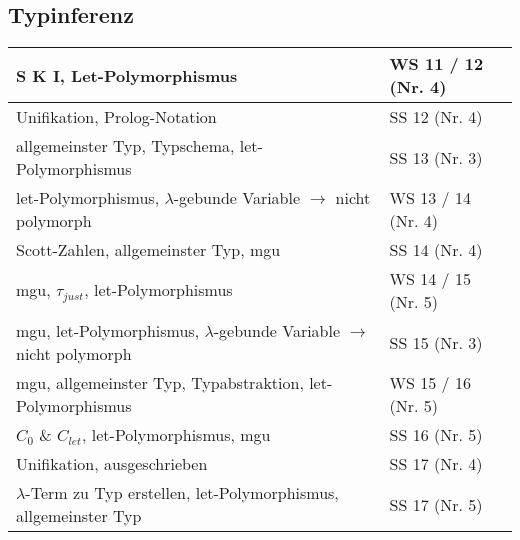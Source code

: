 \subsection*{Typinferenz}
\begin{table}[h]
\centering
\begin{tabular}{l|l}
	S K I, Let-Polymorphismus
	& WS 11 / 12  (Nr. 4) \\ \hline
	
	Unifikation, Prolog-Notation
	& SS 12 (Nr. 4) \\ \hline
	
	allgemeinster Typ, Typschema, let-Polymorphismus 
	& SS 13 (Nr. 3)\\ \hline
	
	let-Polymorphismus, $\lambda$-gebunde Variable $\rightarrow$ nicht polymorph 
	& WS 13 / 14 (Nr. 4)\\ \hline
	
	Scott-Zahlen, allgemeinster Typ, mgu 
	& SS 14 (Nr. 4)\\ \hline
	
	mgu, $\tau_{just}$, let-Polymorphismus
	& WS 14 / 15 (Nr. 5) \\ \hline
	
	mgu, let-Polymorphismus, $\lambda$-gebunde Variable $\rightarrow$ nicht polymorph
	& SS 15 (Nr. 3) \\ \hline
	
	mgu, allgemeinster Typ, Typabstraktion, let-Polymorphismus
	& WS 15 / 16 (Nr. 5) \\ \hline
	
	$C_0$ \& $C_{let}$, let-Polymorphismus, mgu
	& SS 16 (Nr. 5) \\ \hline
	
	Unifikation, ausgeschrieben
	& SS 17 (Nr. 4) \\ \hline
	
	$\lambda$-Term zu Typ erstellen, let-Polymorphismus, allgemeinster Typ
	& SS 17 (Nr. 5) \\ \hline
\end{tabular}
\end{table}
\FloatBarrier

